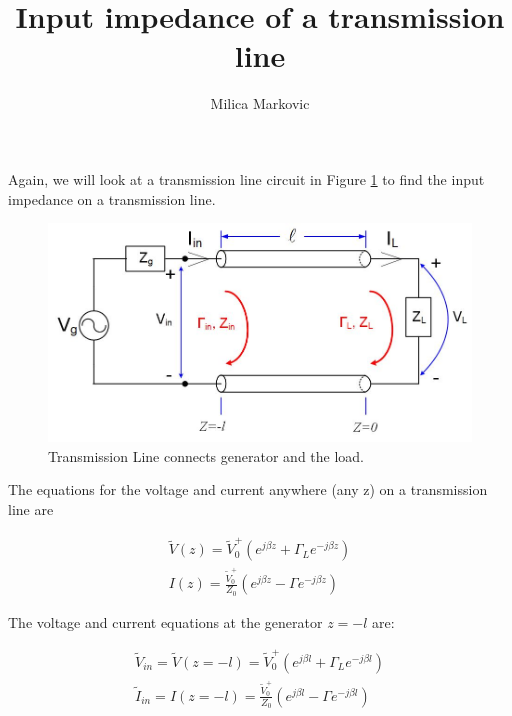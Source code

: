 \documentclass{ximera}
\title{Input impedance of a transmission line}
\author{Milica Markovic}
\begin{document}
  
\begin{abstract}  

\end{abstract}  
\maketitle    



Again, we will look at a transmission line circuit in Figure \ref{fig:IITRLine} to find the input impedance on a transmission line.

\begin{figure}[htbp]
\begin{center}
\includegraphics[scale=0.3]{../jpg/trline.jpg}
\end{center}
\caption{Transmission Line connects generator and the load.}
\label{fig:IITRLine}
\end{figure}




The equations for the voltage and current anywhere (any z) on a transmission line  are


\begin{eqnarray}
\tilde{V}(z)= \tilde{V}_0^+ (e^{j \beta z} + \Gamma_L  e^{-j \beta z }  ) \label{eq:vtlfin} \\
I(z)=   \frac{\tilde{V}_0^+}{Z_0}  (e^{j \beta z} - \Gamma  e^{-j \beta z}  ) \label{eq:itlfin}
\end{eqnarray}


The voltage and current equations at the generator $z=-l$ are:

\begin{eqnarray}
\tilde{V}_{in}=\tilde{V}(z=-l)= \tilde{V}_0^+ (e^{j \beta l} + \Gamma_L  e^{-j \beta l }  )  \\
\tilde{I}_{in}=I(z=-l)=   \frac{\tilde{V}_0^+}{Z_0}  (e^{j \beta l} - \Gamma  e^{-j \beta l}  ) 
\end{eqnarray}
\end{document}
